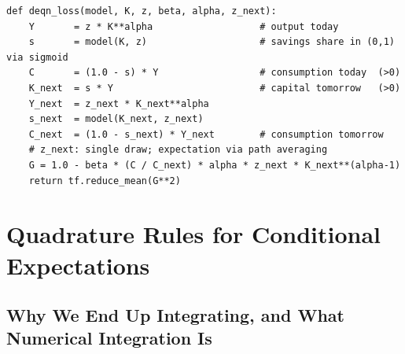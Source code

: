 \documentclass[11pt,a4paper]{report}
\begin{document}
\begin{lstlisting}[caption={Representative DEQN loss for Brock--Mirman with path averaging.  The network outputs a savings share $s \in (0,1)$ via a sigmoid, which jointly enforces $C > 0$ \emph{and} $K' > 0$ — softplus on $C$ alone would not, since $C > z K^\alpha$ would yield $K' < 0$ and an undefined $K'^{\,\alpha-1}$.}]
def deqn_loss(model, K, z, beta, alpha, z_next):
    Y       = z * K**alpha                   # output today
    s       = model(K, z)                    # savings share in (0,1) via sigmoid
    C       = (1.0 - s) * Y                  # consumption today  (>0)
    K_next  = s * Y                          # capital tomorrow   (>0)
    Y_next  = z_next * K_next**alpha
    s_next  = model(K_next, z_next)
    C_next  = (1.0 - s_next) * Y_next        # consumption tomorrow
    # z_next: single draw; expectation via path averaging
    G = 1.0 - beta * (C / C_next) * alpha * z_next * K_next**(alpha-1)
    return tf.reduce_mean(G**2)
\end{lstlisting}

\section{Quadrature Rules for Conditional Expectations}
\label{sec:quadrature_rules}

\subsection{Why We End Up Integrating, and What Numerical Integration Is}
\label{sec:integration_primer}
\end{document}

